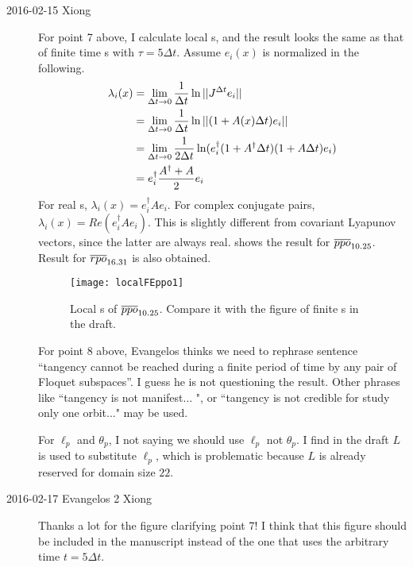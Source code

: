 \begin{description}
\begin{enumerate}
\end{enumerate}

\item[2016-02-15 Xiong]
For point 7 above,
I calculate local \Fe s, and the result looks the same as that of
finite time \Fe s with $\tau = 5\Delta t$.
Assume $e_i(x)$ is normalized in the following.
\begin{align*}
  \lambda_i(x) & = \lim_{\Delta t \to 0} \frac{1}{\Delta t} \ln ||J^{\Delta t} e_i|| \\
               & = \lim_{\Delta t \to 0} \frac{1}{\Delta t} \ln ||(1+A(x)\Delta t) e_i|| \\
               & = \lim_{\Delta t \to 0} \frac{1}{2\Delta t} \ln (e^\dagger_i(1+A^\dagger\Delta t)(1+A\Delta t) e_i) \\
               & = e^\dagger_i \frac{A^\dagger + A}{2} e_i \\
\end{align*}
For real \Fv s, $\lambda_i(x) = e^\dagger_i  A e_i$. For complex conjugate pairs,
$\lambda_i(x) = Re(e^\dagger_i  A e_i)$. This is slightly different from covariant Lyapunov vectors,
since the latter are
always real.  shows the result for ${\overline{ppo}}_{10.25}$. Result for
${\overline{rpo}}_{16.31}$ is also obtained.
\begin{figure}[h]
  \centering
  \texttt{[image: localFEppo1]}
  \caption{Local \Fe s of ${\overline{ppo}}_{10.25}$. Compare it with the
    figure of finite \Fe s in the draft.
  }
  \label{fig:localFEppo1}
\end{figure}

For point 8 above, Evangelos thinks we need to rephrase
sentence ``tangency cannot be reached during a finite period
of time by any pair of Floquet subspaces''. I guess he is not
questioning the result.  Other phrases like
``tangency is not manifest... ", or ``tangency is not credible for
study only one orbit..." may be used.


For $\ell_p$ and $\theta_p$, I not saying we should use $\ell_p$
not $\theta_p$.
I find in the draft $L$ is used to substitute $\ell_p$, which is
problematic because $L$ is already reserved for domain size $22$.


\item[2016-02-17 Evangelos 2 Xiong] Thanks a lot for the figure
clarifying point 7! I think that this figure should be included
in the manuscript instead of the one that uses the arbitrary time
$t=5\Delta t$.


\end{description}

